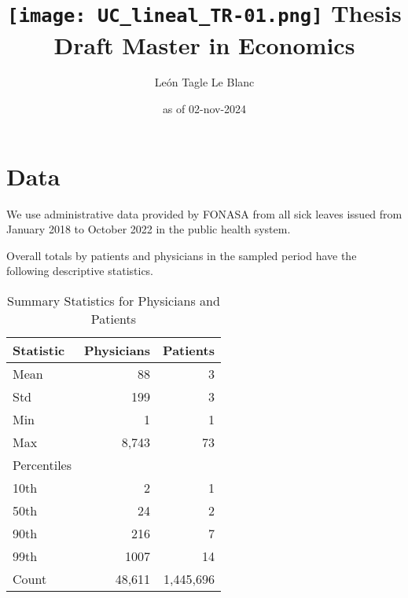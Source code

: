 \documentclass[11pt]{article}
\title{\texttt{[image: UC\_lineal\_TR-01.png]} \linebreak \linebreak 
Thesis Draft \linebreak Master in Economics}
\author{León Tagle Le Blanc}
\date{as of 02-nov-2024}
\begin{document}
\begin{titlepage}
\maketitle
\thispagestyle{empty}

\newpage
\tableofcontents
\setcounter{page}{0}
\thispagestyle{empty}
\end{titlepage}











\section{Data}

We use administrative data provided by FONASA from all sick leaves issued from January 2018 to October 2022 in the public health system.

Overall totals by patients and physicians in the sampled period have the following descriptive statistics.

\begin{table}[h]
    \centering
    \begin{tabular}{lrr}
    \toprule
    Statistic & Physicians & Patients \\
    \midrule
    Mean      & 88     & 3       \\
    Std       & 199     & 3       \\
    Min       & 1      & 1      \\
    Max       & 8,743    & 73     \\
    Percentiles & & \\
    \hspace{1em}10th     & 2       & 1       \\
    \hspace{1em}50th  & 24    & 2       \\
    \hspace{1em}90th    & 216     & 7       \\
    99th     & 1007    & 14      \\
    Count     & 48,611   & 1,445,696 \\
    \bottomrule
    \end{tabular}
    \caption{Summary Statistics for Physicians and Patients}
\end{table}
\end{document}
